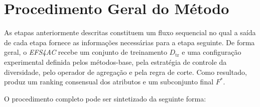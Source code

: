 \section{Procedimento Geral do Método}
\label{sec:ac-efs-procedimento}

As etapas anteriormente descritas constituem um fluxo sequencial no qual a
saída de cada etapa fornece as informações necessárias para a etapa seguinte.
De forma geral, o \textit{EFS4AC} recebe um conjunto de treinamento
$D_{\mathrm{tr}}$ e uma configuração experimental definida pelos métodos-base,
pela estratégia de controle da diversidade, pelo operador de agregação e pela
regra de corte. Como resultado, produz um ranking consensual dos atributos e
um subconjunto final $F^{*}$.

O procedimento completo pode ser sintetizado da seguinte forma:

